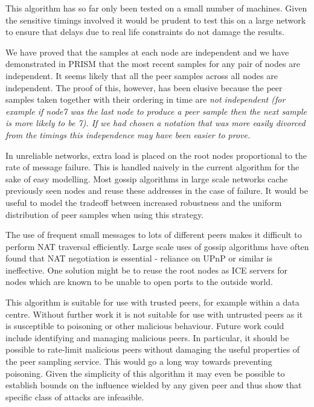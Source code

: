 \documentclass[a4paper,10pt]{article}
\begin{document}
This algorithm has so far only been tested on a small number of machines. Given the sensitive timings involved it would be prudent to test this on a large network to ensure that delays due to real life constraints do not damage the results.

We have proved that the samples at each node are independent and we have demonstrated in PRISM that the most recent samples for any pair of nodes are independent. It seems likely that all the peer samples across all nodes are independent. The proof of this, however, has been elusive because the peer samples taken together with their ordering in time are \em not \em independent (for example if node7 was the last node to produce a peer sample then the next sample is more likely to be 7). If we had chosen a notation that was more easily divorced from the timings this independence may have been easier to prove.

In unreliable networks, extra load is placed on the root nodes proportional to the rate of message failure. This is handled naively in the current algorithm for the sake of easy modelling. Most gossip algorithms in large scale networks cache previously seen nodes and reuse these addresses in the case of failure. It would be useful to model the tradeoff between increased robustness and the uniform distribution of peer samples when using this strategy.

The use of frequent small messages to lots of different peers makes it difficult to perform NAT traversal efficiently. Large scale uses of gossip algorithms have often found that NAT negotiation is essential \cite{arrg, tribler} - reliance on UPnP or similar is ineffective. One solution might be to reuse the root nodes as ICE servers for nodes which are known to be unable to open ports to the outside world.

This algorithm is suitable for use with trusted peers, for example within a data centre. Without further work it is not suitable for use with untrusted peers as it is susceptible to poisoning or other malicious behaviour. Future work could include identifying and managing malicious peers. In particular, it should be possible to rate-limit malicious peers without damaging the useful properties of the peer sampling service. This would go a long way towards preventing poisoning. Given the simplicity of this algorithm it may even be possible to establish bounds on the influence wielded by any given peer and thus show that specific class of attacks are infeasible. 



\clearpage
\end{document}
